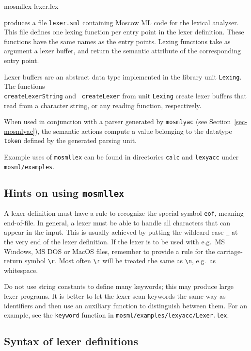 \documentclass[fleqn]{article}
\begin{document}
\begin{program}
mosmllex lexer.lex  
\end{program}

\noindent produces a file {\tt lexer.sml} containing Moscow ML code
for the lexical analyser.  This file defines one lexing function per
entry point in the lexer definition.  These functions have the same
names as the entry points.  Lexing functions take as argument a lexer
buffer, and return the semantic attribute of the corresponding entry
point.

Lexer buffers are an abstract data type implemented in the library
unit {\tt Lexing}.  The functions\\ {\tt createLexerString} and {\tt
  createLexer} from unit {\tt Lexing} create lexer buffers that read
from a character string, or any reading function, respectively.

When used in conjunction with a parser generated by {\tt mosmlyac}
(see Section~\ref{sec-mosmlyac}), the semantic actions compute a value
belonging to the datatype {\tt token} defined by the generated parsing
unit.

Example uses of {\tt mosmllex} can be found in directories {\tt calc}
and {\tt lexyacc} under {\tt mosml/examples}.


\subsection{Hints on using {\tt mosmllex}}

A lexer definition must have a rule to recognize the special symbol
{\tt eof}, meaning end-of-file.  In general, a lexer must be able to
handle all characters that can appear in the input.  This is usually
achieved by putting the wildcard case \verb#_# at the very end of the
lexer definition.  If the lexer is to be used with e.g.\ MS Windows,
MS DOS or MacOS files, remember to provide a rule for the
carriage-return symbol \verb#\r#.  Most often \verb#\r# will be
treated the same as \verb#\n#, e.g.\ as whitespace.

Do not use string constants to define many keywords; this may produce
large lexer programs.  It is better to let the lexer scan keywords the
same way as identifiers and then use an auxiliary function to
distinguish between them.  For an example, see the {\tt keyword}
function in {\tt mosml/examples/lexyacc/Lexer.lex}.


\subsection{Syntax of lexer definitions}
\end{document}
